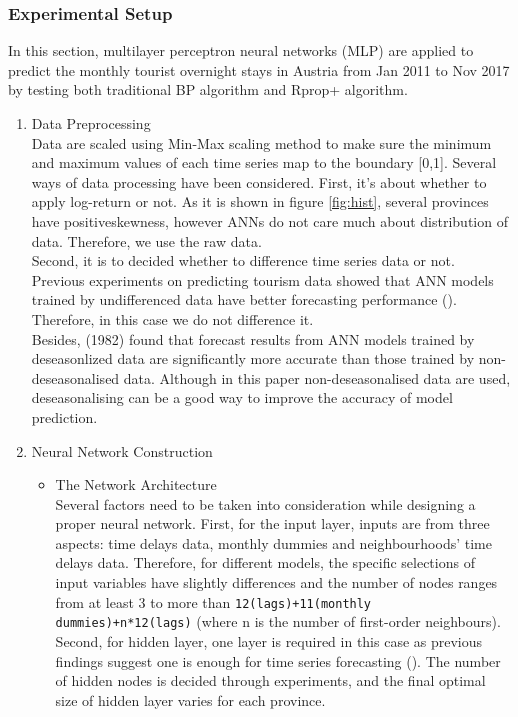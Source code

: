\documentclass[a4paper,reqno,]{article}
\begin{document}
\subsubsection{Experimental Setup}
In this section, multilayer perceptron neural networks (MLP) are applied to predict the monthly tourist overnight stays in Austria from Jan 2011 to Nov 2017 by testing both traditional BP algorithm and Rprop+ algorithm. 
\begin{enumerate}
  \item Data Preprocessing
\\Data are scaled using Min-Max scaling method to make sure the minimum and maximum values of each time series map to the boundary [0,1]. Several ways of data processing have been considered. First, it's about whether to apply log-return or not. As it is shown in figure \ref{fig:hist}, several provinces have positiveskewness, however ANNs do not care much about distribution of data. Therefore, we use the raw data. 
\\Second, it is to decided whether to difference time series data or not. Previous experiments on predicting tourism data showed that ANN models trained by undifferenced data have better forecasting performance (\cite{taieb2014machine}). Therefore, in this case we do not difference it. 
\\Besides, \citeauthor{makridakis1982accuracy} (1982) found that forecast results from ANN models trained by deseasonlized data are significantly more accurate than those trained by non-deseasonalised data. Although in this paper non-deseasonalised data are used, deseasonalising can be a good way to improve the accuracy of model prediction.
  \item Neural Network Construction
  \begin{itemize}
    \item The Network Architecture
    \\Several factors need to be taken into consideration while designing a proper neural network. First, for the input layer, inputs are from three aspects: time delays data, monthly dummies and neighbourhoods’ time delays data. Therefore, for different models, the specific selections of input variables have slightly differences and the number of nodes ranges from at least 3 to more than \texttt{12(lags)+11(monthly dummies)+n*12(lags)} (where n is the number of first-order neighbours). 
    \\Second, for hidden layer, one layer is required in this case as previous findings suggest one is enough for time series forecasting (\cite{dong2013one}). The number of hidden nodes is decided through experiments, and the final optimal size of hidden layer varies for each province. 

\end{itemize}
\end{enumerate}
\end{document}

